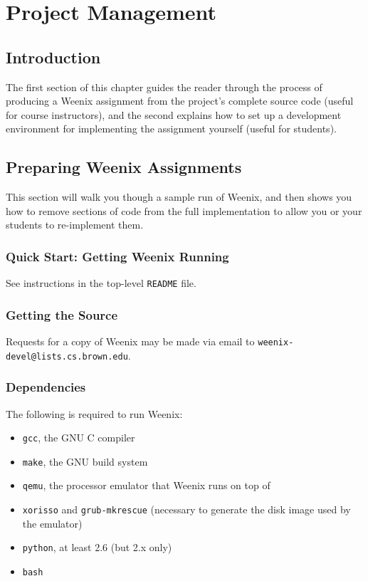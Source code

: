 \chapter{Project Management}
\label{project-management}

\section{Introduction}

The first section of this chapter guides the reader through the process of producing a Weenix assignment from the project's complete source code (useful for course instructors), and the second explains how to set up a development environment for implementing the assignment yourself (useful for students).

\section{Preparing Weenix Assignments}

This section will walk you though a sample run of Weenix, and then shows you how to remove sections of code from the full implementation to allow you or your students to re-implement them.

\subsection{Quick Start: Getting Weenix Running} \label{quickstart}

See instructions in the top-level \texttt{README} file.


\subsection{Getting the Source}
Requests for a copy of Weenix may be made via email to \texttt{weenix-devel@lists.cs.brown.edu}.
\subsection{Dependencies}
The following is required to run Weenix:

\begin{itemize}
\item \texttt{gcc}, the GNU C compiler %
\item \texttt{make}, the GNU build system
\item \texttt{qemu},%
the processor emulator that Weenix runs on top of
\item \texttt{xorisso} and \texttt{grub-mkrescue} (necessary to generate the disk image used by the emulator)
\item \texttt{python}, at least 2.6 (but 2.x only)
\item \texttt{bash}
\end{itemize}

